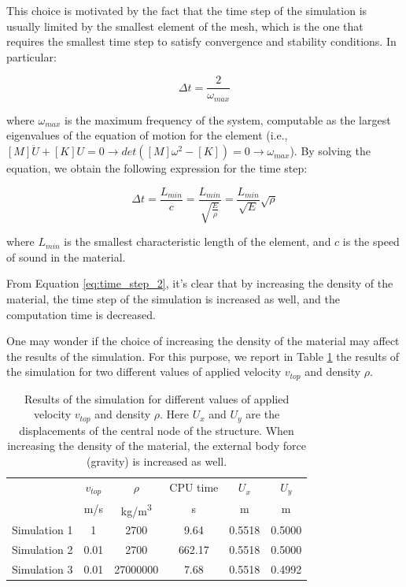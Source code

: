 This choice is motivated by the fact that the time step of the simulation is usually limited by the smallest element of the mesh, which is the one that requires the smallest time step to satisfy convergence and stability conditions.
In particular:

\begin{equation}
    \Delta t = \frac{2}{\omega_{max}}
    \label{eq:time_step}
\end{equation}

where $\omega_{max}$ is the maximum frequency of the system, computable as the largest eigenvalues of the equation of motion for the element (i.e., $[M] \ddot{U} + [K] U = 0 \rightarrow det([M] \omega^2 - [K]) = 0 \rightarrow \omega_{max}$).
By solving the equation, we obtain the following expression for the time step:

\begin{equation}
    \Delta t = \frac{L_{min}}{c} = \frac{L_{min}}{\sqrt{\frac{E}{\rho}}} = \frac{L_{min}}{\sqrt{E}} \sqrt{\rho}
    \label{eq:time_step_2}
\end{equation}


where $L_{min}$ is the smallest characteristic length of the element, and $c$ is the speed of sound in the material.

From Equation \ref{eq:time_step_2}, it's clear that by increasing the density of the material, the time step of the simulation is increased as well, and the computation time is decreased.

One may wonder if the choice of increasing the density of the material may affect the results of the simulation.
For this purpose, we report in Table \ref{tab:time_step_validation} the results of the simulation for two different values of applied velocity $v_{top}$ and density $\rho$.

\begin{table}[H]
    \centering
    \begin{tabular}{|l|c|c|c|c|c|}
        \hline
        ~            & $v_{top}$ & $\rho$                  & CPU time & $U_x$  & $U_y$  \\
        ~            & m/s       & kg/m\textsuperscript{3} & s        & m      & m      \\
        \hline
        Simulation 1 & 1         & 2700                    & 9.64     & 0.5518 & 0.5000 \\
        Simulation 2 & 0.01      & 2700                    & 662.17   & 0.5518 & 0.5000 \\
        Simulation 3 & 0.01      & 27000000                & 7.68     & 0.5518 & 0.4992 \\
        \hline
    \end{tabular}
    \caption{
        Results of the simulation for different values of applied velocity $v_{top}$ and density $\rho$.
        Here $U_x$ and $U_y$ are the displacements of the central node of the structure.
        When increasing the density of the material, the external body force (gravity) is increased as well.
    }
    \label{tab:time_step_validation}
\end{table}


